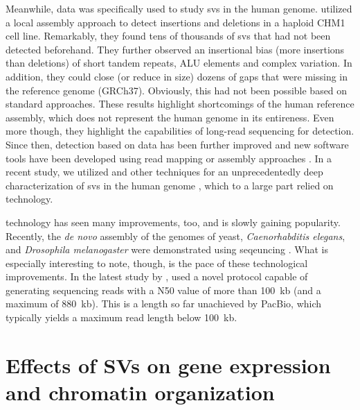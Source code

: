 Meanwhile, \pacbio \wgs data was specifically used to study \acp{sv} in the
human genome. \citet{Chaisson2014} utilized a local assembly approach to detect
insertions and deletions in a haploid CHM1 cell line. Remarkably, they found
tens of thousands of \acp{sv} that had not been detected beforehand. They further
observed an insertional bias (more insertions than deletions) of short tandem
repeats, ALU elements and complex variation. In addition, they could close (or
reduce in size) dozens of gaps that were missing in the reference genome
(GRCh37). Obviously, this had not been possible based on standard \mps
approaches. These results highlight shortcomings of the human reference assembly,
which does not represent the human genome in its entireness. Even more though,
they highlight the capabilities of long-read sequencing for \sv detection.
Since then, \sv detection based on \pacbio data has been further improved and
new software tools have been developed using read mapping or assembly approaches
\citep{Pendleton2015,Huddleston2017}. In a recent study, we utilized \pacbio and
other techniques for an unprecedentedly deep characterization of \acp{sv} in
the human genome \citep{Chaisson2017}, which to a large part relied on \pacbio
technology.

\ont technology has seen many improvements, too, and is slowly gaining
popularity. Recently, the \textit{de novo} assembly of the genomes of yeast,
\textit{Caenorhabditis elegans}, and \textit{Drosophila melanogaster} were
demonstrated using \ont seqeuncing \citep{Istace2017,Tyson2017,Solares2018}.
What is especially interesting to note, though, is the pace of these technological
improvements. In the latest study by \ont, \citet{Jain2018} used a novel protocol
capable of generating sequencing reads with a N50 value of more than 100~kb
(and a maximum of 880~kb). This is a length so far unachieved by PacBio, which
typically yields a maximum read length below 100~kb.





\section{Effects of SVs on gene expression and chromatin organization}

